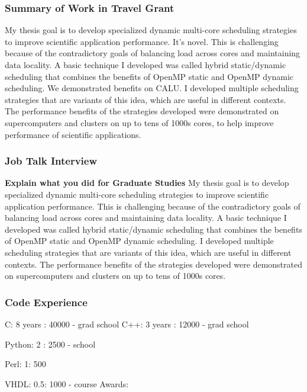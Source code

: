 \begin{frame}
\frametitle{Summary of Work in Travel Grant}
{\tiny My thesis goal is to develop specialized dynamic multi-core
  scheduling strategies to improve scientific application performance.
  It's novel. This is challenging because of the contradictory goals
  of balancing load across cores and maintaining data locality. A
  basic technique I developed was called hybrid static/dynamic
  scheduling that combines the benefits of OpenMP static and OpenMP
  dynamic scheduling. We demonstrated benefits on CALU. I developed
  multiple scheduling strategies that are variants of this idea, which
  are useful in different contexts. The performance benefits of the
  strategies developed were demonstrated on supercomputers and
  clusters on up to tens of 1000s cores, to help improve performance
  of scientific applications.}
\end{frame} 

\begin{frame}
\frametitle{Job Talk Interview}
\textbf{Explain what you did for Graduate Studies}
{\tiny My thesis goal is to develop specialized dynamic multi-core scheduling
strategies to improve scientific application performance. This is
challenging because of the contradictory goals of balancing load
across cores and maintaining data locality. A basic technique I
developed was called hybrid static/dynamic scheduling that combines
the benefits of OpenMP static and OpenMP dynamic scheduling. I
developed multiple scheduling strategies that are variants of this
idea, which are useful in different contexts. The performance benefits
of the strategies developed were demonstrated on supercomputers and
clusters on up to tens of 1000s cores.}
\end{frame} 

\begin{frame} 
\frametitle{Code Experience}
C: 8 years :  40000 - grad school
C++:  3 years :  12000 - grad school 

Python: 2 :  2500 - school 

Perl:  1: 500  

VHDL: 0.5: 1000 - course 
Awards: 
\end{frame} 

